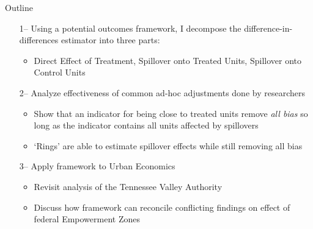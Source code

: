 \documentclass[aspectratio=169]{beamer}
\begin{document}

\begin{frame}{Outline}

    \begin{itemize}
        \item[1--] Using a potential outcomes framework, I decompose the difference-in-differences estimator into three parts:
        \begin{itemize}
            \item Direct Effect of Treatment, Spillover onto Treated Units, Spillover onto Control Units
        \end{itemize} 
        
        \pause
        \item[2--] Analyze effectiveness of common ad-hoc adjustments done by researchers
        \begin{itemize}
            \item Show that an indicator for being close to treated units remove \textit{all bias} so long as the indicator contains all units affected by spillovers
            \item `Rings' are able to estimate spillover effects while still removing all bias
        \end{itemize}  

        \pause
        \item[3--] Apply framework to Urban Economics
        \begin{itemize}
            \item Revisit \citet{Kline_Moretti_2014a} analysis of the Tennessee Valley Authority
            
            \item Discuss how framework can reconcile conflicting findings on effect of federal Empowerment Zones \citep{Busso_Gregory_Kline_2013,Neumark_Kolko_2010}
        \end{itemize}
    \end{itemize} 
\end{frame}
\end{document}
